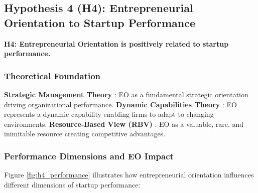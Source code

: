 \documentclass[../Main.tex]{subfiles}
\begin{document}
    \subsection{Hypothesis 4 (H4): Entrepreneurial Orientation to Startup Performance}
    \textbf{H4: Entrepreneurial Orientation is positively related to startup performance.}

    \subsubsection{Theoretical Foundation}
    \textbf{Strategic Management Theory} \autocite{miller1983correlates, covin1989strategic}: EO as a fundamental strategic orientation driving organizational performance. 
    \textbf{Dynamic Capabilities Theory} \autocite{teece1997dynamic}: EO represents a dynamic capability enabling firms to adapt to changing environments. 
    \textbf{Resource-Based View (RBV)} \autocite{barney1991firm}: EO as a valuable, rare, and inimitable resource creating competitive advantages.

    \subsubsection{Performance Dimensions and EO Impact}
    Figure \ref{fig:h4_performance} illustrates how entrepreneurial orientation influences different dimensions of startup performance:
\end{document}
